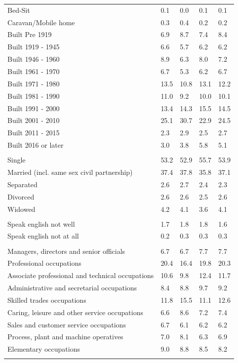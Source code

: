 \documentclass{article}
\begin{document}
\begin{table}[h]
\begin{tabular}{KTTTT}
Bed-Sit & 0.1& 0.0& 0.1& 0.1\\
Caravan/Mobile home & 0.3& 0.4& 0.2& 0.2\\
    \hline
Built Pre 1919 & 6.9& 8.7& 7.4& 8.4\\
Built 1919 - 1945 & 6.6& 5.7& 6.2& 6.2\\
Built  1946 - 1960 & 8.9& 6.3& 8.0& 7.2\\
Built  1961 - 1970 & 6.7& 5.3& 6.2& 6.7\\
Built  1971 - 1980 & 13.5& 10.8& 13.1& 12.2\\
Built  1981 - 1990 & 11.0&  9.2& 10.0& 10.1\\
Built  1991 - 2000 & 13.4& 14.3& 15.5& 14.5\\
Built  2001 - 2010 & 25.1& 30.7& 22.9& 24.5\\
Built  2011 - 2015 & 2.3& 2.9& 2.5& 2.7\\
Built  2016 or later & 3.0& 3.8& 5.8& 5.1\\
\hline
    \\
    \hline
Single & 53.2& 52.9& 55.7& 53.9\\
Married (incl. same sex civil partnership) & 37.4& 37.8& 35.8& 37.1\\
Separated  & 2.6& 2.7& 2.4& 2.3\\
Divorced  & 2.6& 2.6& 2.5& 2.6\\
Widowed & 4.2& 4.1& 3.6& 4.1\\
\hline
    \\ 
    \hline
Speak english not well & 1.7& 1.8& 1.8& 1.6\\
Speak english not at all & 0.2& 0.3& 0.3& 0.3\\
\hline
    \\
    \hline
Managers, directors and senior officials & 6.7& 6.7& 7.7& 7.7\\
Professional occupations & 20.4& 16.4& 19.8& 20.3\\
Associate professional and technical occupations & 10.6&  9.8& 12.4& 11.7\\
Administrative and secretarial occupations & 8.4& 8.8& 9.7& 9.2\\
Skilled trades occupations & 11.8& 15.5& 11.1& 12.6\\
Caring, leisure and other service occupations & 6.6& 8.6& 7.2& 7.4\\
Sales and customer service occupations & 6.7& 6.1& 6.2& 6.2\\
Process, plant and machine operatives & 7.0& 8.1& 6.3& 6.9\\
Elementary occupations & 9.0& 8.8& 8.5& 8.2\\
\hline
\end{tabular}
\end{table}
\end{document}

